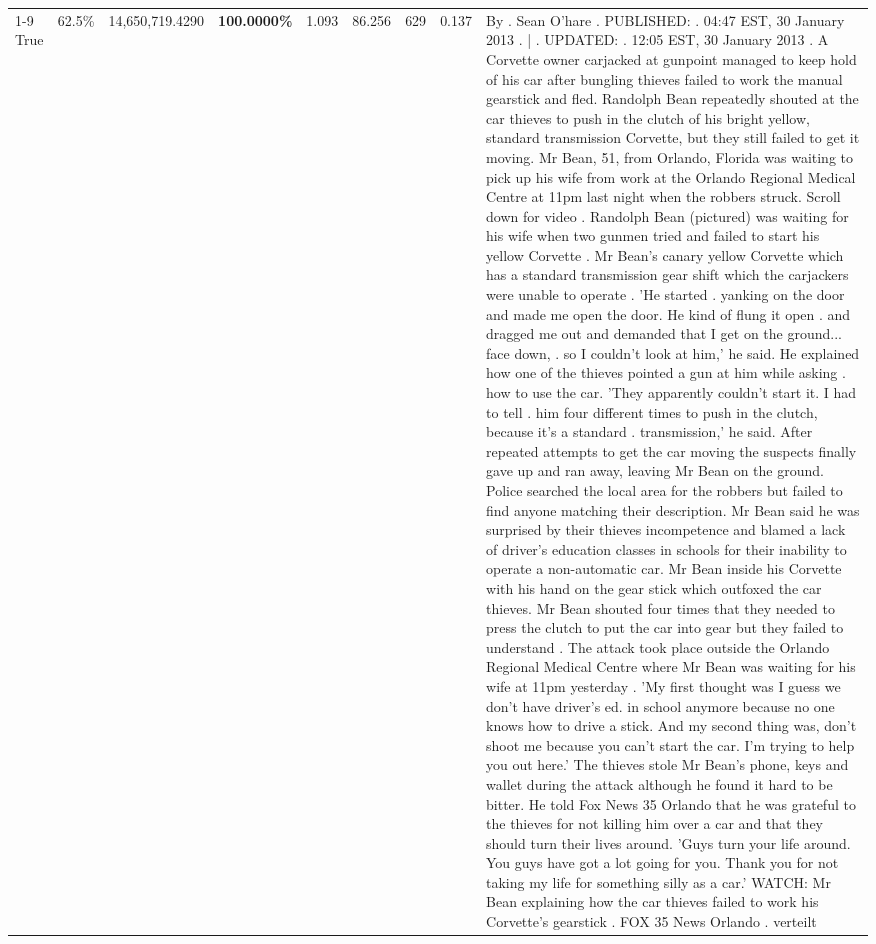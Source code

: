 \begin{table}[H]
\begin{tabular}{lllrlllll}
\cline{1-9} \cline{2-9}
True & 62.5\% & 14,650,719.4290 & \bfseries \color{red} 100.0000\% & 1.093 & 86.256 & 629 & 0.137 & By . Sean O'hare . PUBLISHED: . 04:47 EST, 30 January 2013 . | . UPDATED: . 12:05 EST, 30 January 2013 . A Corvette owner carjacked at gunpoint managed to keep hold of his car after bungling thieves failed to work the manual gearstick and fled. Randolph Bean repeatedly shouted at the car thieves to push in the clutch of his bright yellow, standard transmission Corvette, but they still failed to get it moving. Mr Bean, 51, from Orlando, Florida was waiting to pick up his wife from work at the Orlando Regional Medical Centre at 11pm last night when the robbers struck. Scroll down for video . Randolph Bean (pictured) was waiting for his wife when two gunmen tried and failed to start his yellow Corvette . Mr Bean's canary yellow Corvette which has a standard transmission gear shift which the carjackers were unable to operate . 'He started . yanking on the door and made me open the door. He kind of flung it open . and dragged me out and demanded that I get on the ground... face down, . so I couldn't look at him,' he said. He explained how one of the thieves pointed a gun at him while asking . how to use the car. 'They apparently couldn't start it. I had to tell . him four different times to push in the clutch, because it's a standard . transmission,' he said. After repeated attempts to get the car moving the suspects finally gave up and ran away, leaving Mr Bean on the ground. Police searched the local area for the robbers but failed to find anyone matching their description. Mr Bean said he was surprised by their thieves incompetence and blamed a lack of driver's education classes in schools for their inability to operate a non-automatic car. Mr Bean inside his Corvette with his hand on the gear stick which outfoxed the car thieves. Mr Bean shouted four times that they needed to press the clutch to put the car into gear but they failed to understand . The attack took place outside the Orlando Regional Medical Centre where Mr Bean was waiting for his wife at 11pm yesterday . 'My first thought was I guess we don't have driver's ed. in school anymore because no one knows how to drive a stick. And my second thing was, don't shoot me because you can't start the car. I'm trying to help you out here.' The thieves stole Mr Bean's phone, keys and wallet during the attack although he found it hard to be bitter. He told Fox News 35 Orlando that he was grateful to the thieves for not killing him over a car and that they should turn their lives around. 'Guys turn your life around. You guys have got a lot going for you. Thank you for not taking my life for something silly as a car.' WATCH: Mr Bean explaining how the car thieves failed to work his Corvette's gearstick . FOX 35 News Orlando . verteilt \\

\end{tabular}
\end{table}
